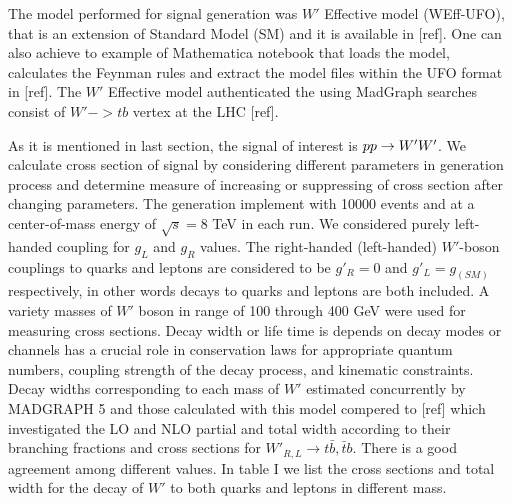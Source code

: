  The model performed for signal generation was $W'$ Effective model {\small (WEff-UFO)}, that is an extension of Standard Model {\small (SM)} and it is available in [ref]. One can also achieve to example of Mathematica notebook that loads the model, calculates the Feynman rules and extract the model files within the UFO format in [ref]. The $W'$ Effective model authenticated the using MadGraph searches consist of $W' -> tb$ vertex at the LHC [ref].
 
  As it is mentioned in last section, the signal of interest is $ pp\rightarrow {\tiny W' W'} $. We calculate cross section of signal by considering different parameters in generation process and determine measure of increasing or suppressing of cross section after changing parameters. The generation implement with 10000 events and at a center-of-mass energy of $ \sqrt{s}=8 $ TeV in each run. We considered purely left-handed coupling  for $ g_L $ and $ g_R $ values.  The right-handed (left-handed) $W'$-boson couplings to quarks and leptons are considered to be $g'_R = 0$ and $g'_L = g_{(SM)}$ respectively, in other words decays to quarks and leptons are both included. A variety masses of $W'$ boson in range of 100 through 400 GeV were used for measuring cross sections.  Decay width or life time is depends on decay modes or channels has a crucial role in conservation laws for appropriate quantum numbers, coupling strength of the decay process, and kinematic constraints. Decay widths corresponding to each mass of $ W' $ estimated concurrently by {\small MADGRAPH 5} and those calculated with this model compered to [ref] which investigated the LO and NLO partial and total width according to their branching fractions and cross sections for  $ W'_{R,L}\rightarrow t \bar{b},\bar{t}b $.  There is a good agreement among different values.  In table I we list the cross sections and total width for the decay of $ W' $ to both quarks and leptons in different mass. 

